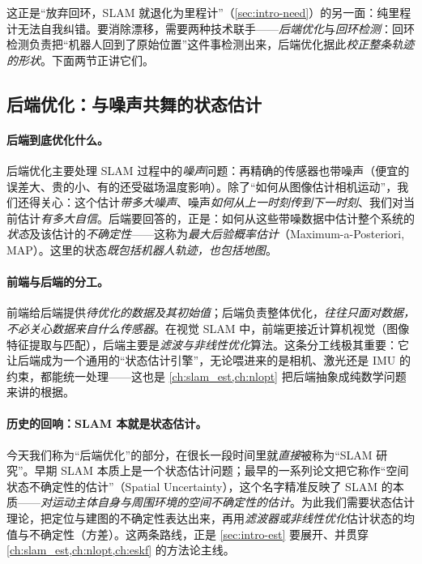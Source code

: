 \noindent 这正是“放弃回环，SLAM 就退化为里程计”（\cref{sec:intro-need}）的另一面：纯里程计无法自我纠错。要消除漂移，需要两种技术联手——\emph{后端优化}与\emph{回环检测}：回环检测负责把“机器人回到了原始位置”这件事检测出来，后端优化据此\emph{校正整条轨迹的形状}。下面两节正讲它们。

\subsection{后端优化：与噪声共舞的状态估计}
\label{sec:intro-backend}
\paragraph{后端到底优化什么。}
后端优化主要处理 SLAM 过程中的\emph{噪声}问题\cite{gaoxiang2019slam14}：再精确的传感器也带噪声（便宜的误差大、贵的小、有的还受磁场温度影响）。除了“如何从图像估计相机运动”，我们还得关心：这个估计\emph{带多大噪声}、噪声\emph{如何从上一时刻传到下一时刻}、我们对当前估计\emph{有多大自信}。后端要回答的，正是：如何从这些带噪数据中估计整个系统的\emph{状态}及该估计的\emph{不确定性}——这称为\emph{最大后验概率估计}（Maximum-a-Posteriori, MAP）。这里的状态\emph{既包括机器人轨迹，也包括地图}。

\paragraph{前端与后端的分工。}
前端给后端提供\emph{待优化的数据及其初始值}；后端负责整体优化，\emph{往往只面对数据，不必关心数据来自什么传感器}\cite{gaoxiang2019slam14}。在视觉 SLAM 中，前端更接近计算机视觉（图像特征提取与匹配），后端主要是\emph{滤波与非线性优化}算法。这条分工线极其重要：它让后端成为一个通用的“状态估计引擎”，无论喂进来的是相机、激光还是 IMU 的约束，都能统一处理——这也是 \cref{ch:slam_est,ch:nlopt} 把后端抽象成纯数学问题来讲的根据。

\paragraph{历史的回响：SLAM 本就是状态估计。}
今天我们称为“后端优化”的部分，在很长一段时间里就\emph{直接}被称为“SLAM 研究”\cite{gaoxiang2019slam14}。早期 SLAM 本质上是一个状态估计问题；最早的一系列论文把它称作“空间状态不确定性的估计”（Spatial Uncertainty），这个名字精准反映了 SLAM 的本质——\emph{对运动主体自身与周围环境的空间不确定性的估计}。为此我们需要状态估计理论，把定位与建图的不确定性表达出来，再用\emph{滤波器或非线性优化}估计状态的均值与不确定性（方差）。这两条路线，正是 \cref{sec:intro-est} 要展开、并贯穿 \cref{ch:slam_est,ch:nlopt,ch:eskf} 的方法论主线。

